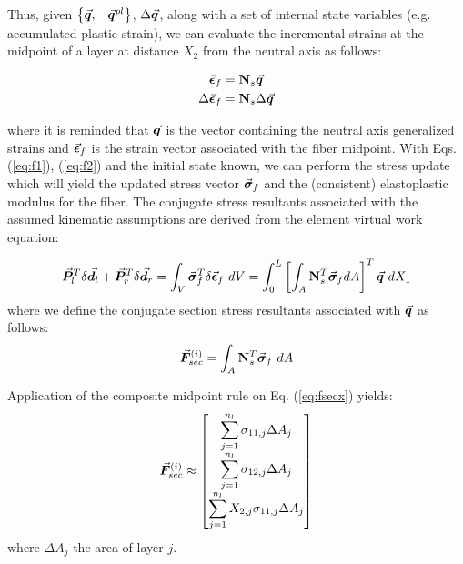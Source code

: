  Thus, given $\begin{Bmatrix}
	\vec{\boldsymbol{q}}, & \vec{\boldsymbol{q}}^{pl}
\end{Bmatrix}$, $\Delta\vec{\boldsymbol{q}}$, along with a set of internal state variables
(e.g. accumulated plastic strain), we can evaluate the incremental strains at
the midpoint of a layer at distance $X_2$ from the neutral axis as follows:

\begin{subequations}
	\begin{gather}
		\vec{\boldsymbol{\epsilon}}_f = \mathbf{N}_s\vec{\boldsymbol{q}}\label{eq:f1}\\
		\Delta\vec{\boldsymbol{\epsilon}}_f = \mathbf{N}_s\Delta\vec{\boldsymbol{q}}\label{eq:f2}
	\end{gather}
\end{subequations}

\noindent where it is reminded that $\vec{\boldsymbol{q}}$ is the vector containing the 
neutral axis generalized strains and $\vec{\boldsymbol{\epsilon}}_f$ is the strain vector
associated with the fiber midpoint. With Eqs. (\ref{eq:f1}), (\ref{eq:f2}) and
the initial state known,  we can perform the stress update which will yield the 
updated stress vector $\vec{\boldsymbol{\sigma}}_f$ and the (consistent) elastoplastic 
modulus for the fiber. The 
conjugate stress resultants associated with the assumed kinematic assumptions 
are derived from the element virtual work equation:

\begin{equation}
	\bvec{P}_l^T\delta\bvec{d}_l +\bvec{P}_r^T\delta\bvec{d}_r  = \int_V 
	\bvec{\sigma}_f^T\delta\bvec{\epsilon}_f\ 
	dV
	= \int_0^L \left[\int_A \bmat{N}_s^T\bvec{\sigma}_fdA\right]^T\bvec{q}\ dX_1
	\label{eq:VIRTUAL_WORK}
\end{equation}
where we define the conjugate section stress resultants associated with 
$\vec{\boldsymbol{q}}$ as follows:
\begin{gather}
	\vec{\boldsymbol{F}}_{sec}^{(i)}=\int_{A} \mathbf{N}_s^T\vec{\boldsymbol{\sigma}}_f \ dA
	\label{eq:fsecx}
\end{gather}

\noindent Application of the composite midpoint rule on Eq. (\ref{eq:fsecx})
yields:
\begin{equation}
	\vec{\boldsymbol{F}}_{sec}^{(i)} \approx 
	\begin{bmatrix}
		\displaystyle\sum_{j=1}^{n_l} \sigma_{11,j}\Delta A_j\\
		\displaystyle\sum_{j=1}^{n_l} \sigma_{12,j} \Delta A_j\\
		\displaystyle\sum_{j=1}^{n_l} X_{2,j}\sigma_{11,j}\Delta A_j\\
	\end{bmatrix}
	\label{eq:STRESS_RES_CONJUGATE}
\end{equation}
\noindent where $\Delta A_j$ the area of layer $j$. 

